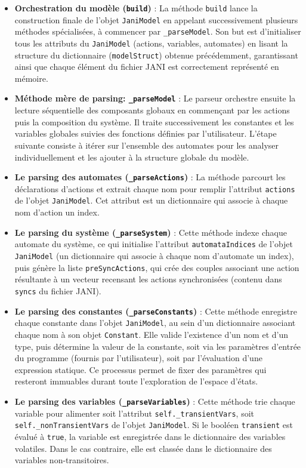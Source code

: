 \documentclass[14pt, a4paper]{extarticle}
\begin{document}
\begin{itemize}
    \item \textbf{Orchestration du modèle (\texttt{build})} : La méthode \texttt{build} lance la construction finale de l'objet \texttt{JaniModel} en appelant successivement plusieurs méthodes spécialisées, à commencer par \texttt{\_parseModel}. Son but est d'initialiser tous les attributs du \texttt{JaniModel} (actions, variables, automates) en lisant la structure du dictionnaire (\texttt{modelStruct}) obtenue précédemment, garantissant ainsi que chaque élément du fichier JANI est correctement représenté en mémoire.
    \item \textbf{Méthode mère de parsing: \texttt{\_parseModel}} : Le parseur orchestre ensuite la lecture séquentielle des composants globaux en commençant par les actions puis la composition du système. Il traite successivement les constantes et les variables globales suivies des fonctions définies par l'utilisateur. L'étape suivante consiste à itérer sur l'ensemble des automates pour les analyser individuellement et les ajouter à la structure globale du modèle.
    \item \textbf{Le parsing des automates (\texttt{\_parseActions})} : La méthode parcourt les déclarations d'actions et extrait chaque nom pour remplir l'attribut \texttt{actions} de l'objet \texttt{JaniModel}. Cet attribut est un dictionnaire qui associe à chaque nom d'action un index. 
\item \textbf{Le parsing du système (\texttt{\_parseSystem})} : Cette méthode indexe chaque automate du système, ce qui initialise l'attribut \texttt{automataIndices} de l'objet \texttt{JaniModel} (un dictionnaire qui associe à chaque nom d'automate un index), puis génère la liste \texttt{preSyncActions}, qui crée des couples associant une action résultante à un vecteur recensant les actions synchronisées (contenu dans \texttt{syncs} du fichier JANI).
\item \textbf{Le parsing des constantes (\texttt{\_parseConstants})} : Cette méthode enregistre chaque constante dans l'objet \texttt{JaniModel}, au sein d'un dictionnaire associant chaque nom à son objet \texttt{Constant}. Elle valide l'existence d'un nom et d'un type, puis détermine la valeur de la constante, soit via les paramètres d'entrée du programme (fournis par l'utilisateur), soit par l'évaluation d'une expression statique. Ce processus permet de fixer des paramètres qui resteront immuables durant toute l'exploration de l'espace d'états.
    \item \textbf{Le parsing des variables (\texttt{\_parseVariables})} : Cette méthode trie chaque variable pour alimenter soit l'attribut \texttt{self.\_transientVars}, soit \texttt{self.\_nonTransientVars} de l'objet \texttt{JaniModel}. Si le booléen \texttt{transient} est évalué à \texttt{true}, la variable est enregistrée dans le dictionnaire des variables volatiles. Dans le cas contraire, elle est classée dans le dictionnaire des variables non-transitoires.

\end{itemize}
\end{document}
